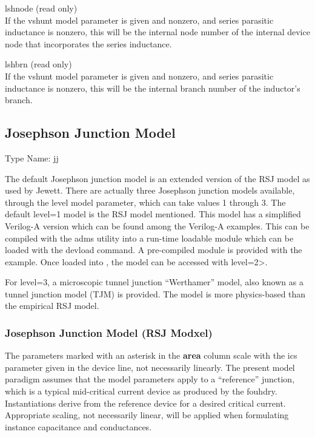 \begin{description}
\item{\vt lshnode} (read only)\\
If the {\vt vshunt} model parameter is given and nonzero, and series
parasitic inductance is nonzero, this will be the internal node number
of the internal device node that incorporates the series inductance.

\item{\vt lshbrn} (read only)\\
If the {\vt vshunt} model parameter is given and nonzero, and series
parasitic inductance is nonzero, this will be the internal branch
number of the inductor's branch.
\end{description}

\subsection{Josephson Junction Model}
\label{jjmodel}


{\cb Type Name:} {\vt jj}

The default Josephson junction model is an extended version of the RSJ
model as used by Jewett\cite{jewett}.  There are actually three
Josephson junction models available, through the {\vt level} model
parameter, which can take values 1 through 3.  The default {\vt
level=1} model is the RSJ model mentioned.  This model has a
simplified Verilog-A version which can be found among the Verilog-A
examples.  This can be compiled with the {\vt adms} utility into a
run-time loadable module which can be loaded with the {\cb devload}
command.  A pre-compiled module is provided with the example.  Once
loaded into {\WRspice}, the model can be accessed with {\vt level=2}>.

For {\vt level=3}, a microscopic tunnel junction ``Werthamer'' model,
also known as a tunnel junction model (TJM) is provided.  The model is
more physics-based than the empirical RSJ model.

\subsubsection{Josephson Junction Model (RSJ Modxel)}

The parameters marked with an asterisk in the {\bf area} column scale
with the {\vt ics} parameter given in the device line, not necessarily
linearly.  The present model paradigm assumes that the model
parameters apply to a ``reference'' junction, which is a typical
mid-critical current device as produced by the fouhdry. 
Instantiations derive from the reference device for a desired critical
current.  Appropriate scaling, not necessarily linear, will be applied
when formulating instance capacitance and conductances.

